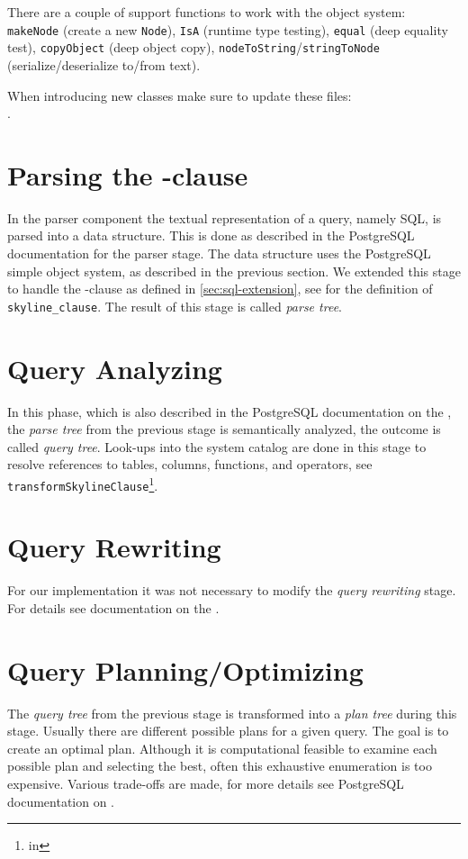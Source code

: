 There are a couple of support functions to work with the object
system: \texttt{makeNode} (create a new \texttt{Node}), \texttt{IsA}
(runtime type testing), \texttt{equal} (deep equality test),
\texttt{copyObject} (deep object copy),
\texttt{nodeToString}/\texttt{stringToNode} (serialize/deserialize
to/from text).

\noindent
When introducing new classes make sure to update these files: \\
.

\section{Parsing the -clause}
In the parser component the textual representation of a query, namely
SQL, is parsed into a data structure.  This is done as described in
the PostgreSQL documentation for the 
{parser stage}.  The data structure uses the PostgreSQL simple object
system, as described in the previous section.  We extended this stage
to handle the -clause as defined in
\autoref{sec:sql-extension}, see  for
the definition of \texttt{skyline\_clause}.  The result of this
stage is called \emph{parse tree}.

\section{Query Analyzing}
In this phase, which is also described in the PostgreSQL documentation on the
, the \emph{parse tree}
from the previous stage is semantically analyzed, the outcome is
called \emph{query tree}.  Look-ups into the system catalog are done in
this stage to resolve references to tables, columns, functions, and
operators, see \texttt{transformSkylineClause}\footnote{in
}.

\section{Query Rewriting}
For our implementation it was not necessary to modify the \emph{query
rewriting} stage.  For details see documentation on the
.

\section{Query Planning/Optimizing}
The \emph{query tree} from the previous stage is transformed into a
\emph{plan tree} during this stage.  Usually there are different
possible plans for a given query.  The goal is to create an optimal
plan.  Although it is computational feasible to examine each possible
plan and selecting the best, often this exhaustive enumeration is
too expensive.  
%
Various trade-offs are made, for more details see PostgreSQL documentation
on .


